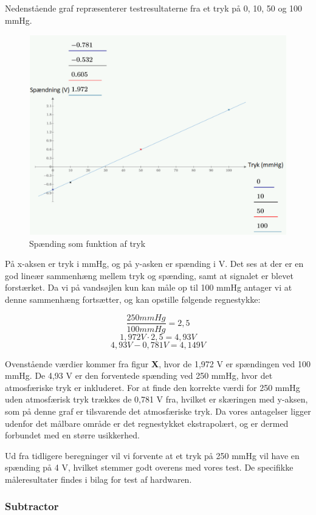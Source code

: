 Nedenstående graf repræsenterer testresultaterne fra et tryk på 0, 10, 50 og 100 mmHg.


\vspace{0.5 cm}

\begin{figure}[h!]
	\centering
	\includegraphics[width=0.6\linewidth]{../Rapport/Implementering_og_test/Hardware/forstaerker}
	\caption{Spænding som funktion af tryk}
	\label{fig:forstaerker}
\end{figure}

\clearpage

På x-aksen er tryk i mmHg, og på y-asken er spænding i V. Det ses at der er en god lineær sammenhæng mellem tryk og spænding, samt at signalet er blevet forstærket. Da vi på vandsøjlen kun kan måle op til 100 mmHg antager vi at denne sammenhæng fortsætter, og kan opstille følgende regnestykke: 

\[\frac{250 mmHg}{100 mmHg} = 2,5 \]
\[ 1,972 V \cdot 2,5 = 4,93 V \]
\[ 4,93 V - 0,781 V = 4,149 V \]

Ovenstående værdier kommer fra figur \textbf{X}, hvor de 1,972 V er spændingen ved 100 mmHg. De 4,93 V er den forventede spænding ved 250 mmHg, hvor det atmosfæriske tryk er inkluderet. For at finde den korrekte værdi for 250 mmHg uden atmosfærisk tryk trækkes de 0,781 V fra, hvilket er skæringen med y-aksen, som på denne graf er tilsvarende det atmosfæriske tryk. Da vores antagelser ligger udenfor det målbare område er det regnestykket ekstrapolært, og er dermed forbundet med en større usikkerhed.

Ud fra tidligere beregninger vil vi forvente at et tryk på 250 mmHg vil have en spænding på 4 V, hvilket stemmer godt overens med vores test. De specifikke måleresultater findes i bilag for test af hardwaren.

\subsubsection{Subtractor}

